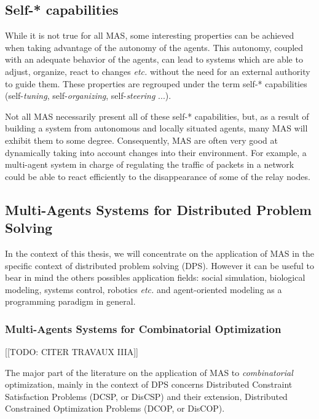 \subsection{Self-* capabilities}

While it is not true for all MAS, some interesting properties can be achieved when taking advantage of the autonomy of the agents. This autonomy, coupled with an adequate behavior of the agents, can lead to systems which are able to adjust, organize, react to changes \emph{etc.} without the need for an external authority to guide them. These properties are regrouped under the term self-* capabilities (self-\emph{tuning}, self-\emph{organizing}, self-\emph{steering} ...).

Not all MAS necessarily present all of these self-* capabilities, but, as a result of building a system from autonomous and locally situated agents, many MAS will exhibit them to some degree. Consequently, MAS are often very good at dynamically taking into account changes into their environment. For example, a multi-agent system in charge of regulating the traffic of packets in a network could be able to react efficiently to the disappearance of some of the relay nodes.

\subsection{Multi-Agents Systems for Distributed Problem Solving}

In the context of this thesis, we will concentrate on the application of MAS in the specific context of distributed problem solving (DPS). However it can be useful to bear in mind the others possibles application fields: social simulation, biological modeling, systems control, robotics \emph{etc.} and agent-oriented modeling as a programming paradigm in general.

\subsubsection{Multi-Agents Systems for Combinatorial Optimization}

[[TODO: CITER TRAVAUX IIIA]]

The major part of the literature on the application of MAS to \emph{combinatorial} optimization, mainly in the context of DPS concerns Distributed Constraint Satisfaction Problems (DCSP, or DisCSP) and their extension, Distributed Constrained Optimization Problems (DCOP, or DisCOP).

